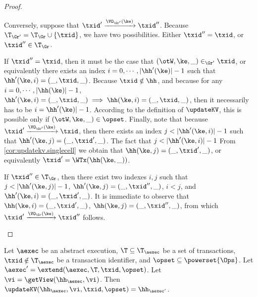 \begin{proof}
\begin{enumerate}
Conversely, suppose that $\txid' \xrightarrow{\VO_{\Gr'}(\ke)} \txid''$. Because 
$\T_{\Gr'} = \T_{\Gr} \cup \{ \txid \}$, we have two possibilities. Either $\txid'' = \txid$, 
or $\txid'' \in \T_{\Gr}$. 

If $\txid'' = \txid$, then it must be the case that $(\otW, \ke, \_) \in_{\Gr'} \txid$, 
or equivalently there exists an index $i=0,\cdots, \lvert \hh'(\ke) \rvert -1 $ such that 
$\hh'(\ke, i) = (\_, \txid, \_)$. Because $\txid \notin \hh$, and because for any 
$i = 0, \cdots, \lvert \hh(\ke) \rvert - 1$, $\hh'(\ke, i) = (\_, \txid, \_) \implies 
\hh(\ke, i) = (\_, \txid, \_)$, then it necessarily has to be $i = \hh'(\ke) \rvert - 1$. 
According to the definition of $\updateKV$, this is possible only if $(\otW,\ke, \_) \in \opset$. 
Finally, note that because $\txid' \xrightarrow{\VO_{\Gr'}(\ke)} \txid$, then 
there exists an index $j < \lvert \hh'(\ke, i) \rvert - 1$ such that 
$\hh'(\ke, j) = (\_, \txid' ,\_)$. The fact that $j < \lvert \hh'(\ke, i) \rvert - 1$ 
From \cref{cor:updatekv.singlecell} we obtain that $\hh(\ke, j) = (\_, \txid', \_)$, 
or equivalently $\txid' = \WTx(\hh(\ke, \_))$. 

If $\txid'' \in \T_{\Gr}$, then there exist two indexes $i,j$ such that 
$j < \lvert \hh'(\ke, j) \rvert - 1$, $\hh'(\ke, j) = (\_, \txid'', \_)$, 
$i < j$, and $\hh'(\ke, i) = (\_, \txid', \_)$. It is immediate to observe 
that $\hh(\ke, i) = (\_, \txid', \_)$, $\hh(\ke, j) = (\_, \txid'', \_)$, 
from which $\txid' \xrightarrow{\VO_{\Gr}(\ke)} \txid''$ follows. 

\end{enumerate}
\end{proof}

\begin{proposition}
\label{prop:extend.update.sameop}
Let $\aexec$ be an abstract execution, $\T \subseteq \T_{\aexec}$ be a set of transactions, 
$\txid \notin \T_{\aexec}$ be a transaction identifier, and $\opset \subseteq \powerset{\Ops}$. 
Let $\aexec' = \extend(\aexec, \T, \txid, \opset)$. 
Let $\vi = \getView(\hh_{\aexec}, \vi)$. 
Then $\updateKV(\hh_{\aexec}, \vi, \txid, \opset) = \hh_{\aexec'}$.
\end{proposition}

